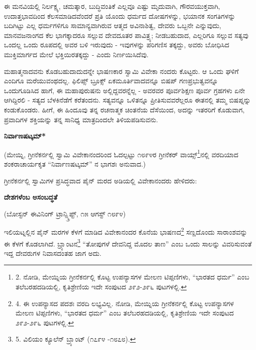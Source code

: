 ಈ ಮನವಿಯಲ್ಲಿ ನಿರ್ಲಕ್ಷ್ಯ, ಚಮತ್ಕಾರ, ಬುದ್ಧಿವಂತಿಕೆ ಎಲ್ಲವೂ ಎಷ್ಟು ಮೃದುವಾಗಿ, ಗೌರವಯುಕ್ತವಾಗಿ, ಉದಾತ್ತಭಾವದಿಂದ ಕೆಲಸಮಾಡಿದವೆಂದರೆ ಪ್ರತಿ ಯೊಂದು ಧರ್ಮದ ದೋಷಗಳನ್ನು, ಭಯಾನಕ ಸಂಗತಿಗಳನ್ನು ಬದಿಗಿಟ್ಟು ಎಲ್ಲ ಧರ್ಮಗಳಿಗೂ ಸಾಮಾನ್ಯವಾಗಿರುವ ಆತ್ಮದ ಅವಿನಾಶಿತ್ವ, ದೇವರು ಒಬ್ಬನೇ ಎನ್ನುವುದು, ಮಾನವಜನಾಂಗದ ಕೆಲ ಭಾಗಕ್ಕಾದರೂ ಸಲ್ಲುವ ದೇವದೂತರ ಪಾವಿತ್ರ್ಯ; ನೀಡಬಹುದಾದ, ಎಲ್ಲರಿಗೂ ಸಲ್ಲುವ ಸತ್ಯವು ಒಂದಲ್ಲ ಒಂದು ರೂಪದಲ್ಲಿ ಅವರ ಬಳಿ ಇರುವುದು - ಇವುಗಳನ್ನು ಪರಿಗಣಿಸ ತಕ್ಕದ್ದು, ಅವರು ಬೋಧಿಸಿದ ಮುಕ್ತಿಮಾರ್ಗದ ಮೇಲೆ ಭಕ್ತಿಯಿರತಕ್ಕದ್ದು - ಎಂದು ನಿರ್ಣಯಿಸಿದೆವು.

ಮಹಾತ್ಮನಾದವನು ಕೊಡಬಹುದಾದುದನ್ನೇ ಭಾಷಣಕಾರ ಸ್ವಾಮಿ ವಿವೇಕಾ ನಂದರು ಕೊಟ್ಟರು. ಆ ಒಂದು ಘಳಿಗೆ ಎಂದಿಗೂ ಮರೆಯುವಂಥದಲ್ಲ. ಫಿಲಿಪ್ಸ್ ಬ್ರೂಕ್ಸ್ ಏಕಮೂರ್ತಿವಾದವನ್ನೂ ಬಿಷಪ್ ಗಣಪ್ರಭುತ್ವವನ್ನೂ ಒಂದುಗೂಡಿಸಿದ ಹಾಗೆ, ಈ ಮಹಾಪುರುಷನು ಅಲ್ಲಿದ್ದವರನ್ನೆಲ್ಲ - ಅವರವರ ಪೂರ್ವಶಿಕ್ಷಣ ಪೂರ್ವ ಗ್ರಹಗಳು ಏನೇ ಆಗಿದ್ದಿರಲಿ - ಸತ್ಯದ ಬೆಳಕಿನೆಡೆಗೆ ಕರೆತಂದನು. ಸತ್ಯವನ್ನೂ ಒಳಿತನ್ನೂ ಪ್ರೀತಿಸುವವರೆಲ್ಲರೂ ಈತನಲ್ಲಿ ತಮ್ಮ ಬಿಷಪ್ನನ್ನು ಕಂಡುಕೊಂಡರು. ಹೀಗೆ, ಈ ಹಿಂದೂವು ತನ್ನ ರಚನಾತ್ಮಕ ಚಿಂತನೆಯ ದೆಸೆಯಿಂದ, ಅದನ್ನು ಇತರರಿಗೆ ಕೊಡುವಾಗ, ಪ್ರವಾದಿಗಳ ಶಕ್ತಿಯನ್ನು ತನ್ನ ಸಾನಿಧ್ಯ ಮಾತ್ರದಿಂದಲೇ ತಿಳಿಯಪಡಿಸುವನು.

\begin{center}
\textbf{ನಿರ್ವಾಣಷಟ್ಕಮ್​*}
\end{center}

(ಮೇಯ್ನಿ, ಗ್ರೀನೆಕರ್ನಲ್ಲಿ ಸ್ವಾಮಿ ವಿವೇಕಾನಂದರಿಂದ ಓದಲ್ಪಟ್ಟು ೧೮೯೪ರ ಗ್ರೀನೆಕರ್ ವಾಯ್ಸ್\footnote{2. ನೋಡಿ, ಮೇಯ್ನಿಯ ಗ್ರೀನೆಕರ್ನಲ್ಲಿ ಕೊಟ್ಟ ಉಪನ್ಯಾಸಗಳ ಮೇಲಣ ಟಿಪ್ಪಣಿಗಳು, “ಭಾರತದ ಧರ್ಮ” ಎಂಬ ತಲೆಬರಹದಡಿಯಲ್ಲಿ, ಕೃತಿಶ್ರೇಣಿಯ ಇದೇ ಸಂಪುಟದ ೨೯೨-೨೯೬ ಪುಟಗಳಲ್ಲಿ.}ನಲ್ಲಿ ವರದಿಯಾದ ಶಂಕರಾಚಾರ್ಯಕೃತ “ನಿರ್ವಾಣಷಟ್ಕಮ್​” ನ ಭಾಗಶಃ ಅನುವಾದ.)

ಗ್ರೀನೆಕರ್ನಲ್ಲಿ ಸ್ವಾಮಿಗಳ ಪ್ರಸಿದ್ಧವಾದ ಪೈನ್ ಮರದ ಅಡಿಯಲ್ಲಿ ವಿವೇಕಾನಂದರು ಹೇಳಿದರು:

\begin{center}
\textbf{ದೇಶಗಳೆಂಬ ಅಸಂಬದ್ಧತೆ}
\end{center}

\begin{center}
(ಬೋಸ್ಟನ್ ಈವಿನಿಂಗ್ ಟ್ರಾನ್ಸ್ಕ್ರಿಪ್ಟ್, ೧೫ ಆಗಸ್ಟ್ ೧೮೯೪)
\end{center}

ಇಲಿಯಟ್ನಲ್ಲಿನ ಪೈನ್ ಮರಗಳ ಕೆಳಗೆ ಮಾಡಿದ ವಿವೇಕಾನಂದರ ಕೊನೆಯ ಭಾಷಣದ\footnote{4. ಈ ಉಪನ್ಯಾಸದ ಪದಶಃ ವರದಿ ಲಭ್ಯವಿಲ್ಲ. ನೋಡಿ, ಮೇಯ್ನಿಯ ಗ್ರೀನೆಕರ್ನಲ್ಲಿ ಕೊಟ್ಟ ಉಪನ್ಯಾಸಗಳ ಮೇಲಣ ಟಿಪ್ಪಣಿಗಳು, “ಭಾರತದ ಧರ್ಮ” ಎಂಬ ತಲೆಬರಹದಡಿಯಲ್ಲಿ, ಕೃತಿಶ್ರೇಣಿಯ ಇದೇ ಸಂಪುಟದ ೨೯೨-೨೯೬ ಪುಟಗಳಲ್ಲಿ.} ಸಣ್ಣದೊಂದು ಸಾರಾಂಶವನ್ನು ಈ ಕೆಳಗೆ ಕೊಡಲಾಗಿದೆ. ಬ್ರ್ಯಾಂಟನ\footnote{5. ವಿಲಿಯಂ ಕ್ಯೂಲೆನ್ ಬ್ರ್ಯಾಂಟ್ (೧೭೯೪ -೧೮೭೮).} “ತೋಪುಗಳೆ ದೇವನಿದ್ದ ಮೊದಲ ತಾಣ” ಎಂಬ ಒಂದು ಸಾಲನ್ನು ವಿವರಿಸುವಂತೆ ಇದ್ದ ದೇವರುಗಳ ನಿವಾಸದಂತಹ ಜಾಗ ಅದು.


